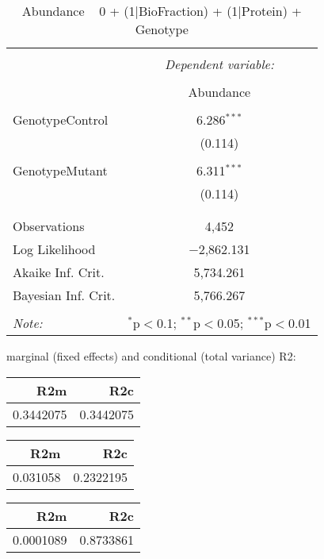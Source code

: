 \documentclass[11pt]{report}
\begin{document}
\begin{table}[!htbp] \centering 
  \caption{Abundance ~ 0 + (1|BioFraction) + (1|Protein) + Genotype} 
  \label{} 
\begin{tabular}{@{\extracolsep{5pt}}lc} 
\\[-1.8ex]\hline 
\hline \\[-1.8ex] 
 & \multicolumn{1}{c}{\textit{Dependent variable:}} \\ 
\cline{2-2} 
\\[-1.8ex] & Abundance \\ 
\hline \\[-1.8ex] 
 GenotypeControl & 6.286$^{***}$ \\ 
  & (0.114) \\ 
  & \\ 
 GenotypeMutant & 6.311$^{***}$ \\ 
  & (0.114) \\ 
  & \\ 
\hline \\[-1.8ex] 
Observations & 4,452 \\ 
Log Likelihood & $-$2,862.131 \\ 
Akaike Inf. Crit. & 5,734.261 \\ 
Bayesian Inf. Crit. & 5,766.267 \\ 
\hline 
\hline \\[-1.8ex] 
\textit{Note:}  & \multicolumn{1}{r}{$^{*}$p$<$0.1; $^{**}$p$<$0.05; $^{***}$p$<$0.01} \\ 
\end{tabular} 
\end{table} 
marginal (fixed effects) and conditional (total variance) R2:

\begin{tabular}{r|r}
\hline
R2m & R2c\\
\hline
0.3442075 & 0.3442075\\
\hline
\end{tabular}

\begin{tabular}{r|r}
\hline
R2m & R2c\\
\hline
0.031058 & 0.2322195\\
\hline
\end{tabular}

\begin{tabular}{r|r}
\hline
R2m & R2c\\
\hline
0.0001089 & 0.8733861\\
\hline
\end{tabular}
\end{document}
